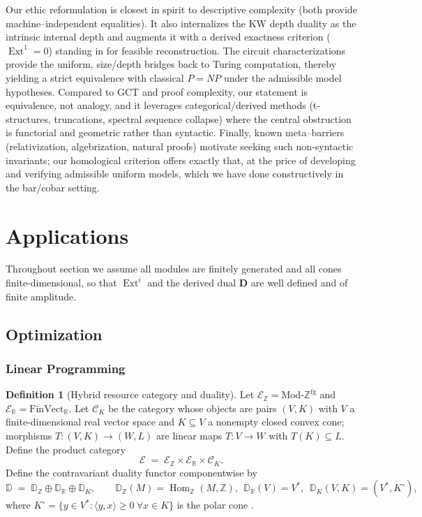 \documentclass[12pt]{article}
\newcommand{\Hom}{\operatorname{Hom}}
\newcommand{\Ext}{\operatorname{Ext}}
\theoremstyle{plain}
\theoremstyle{definition}
\newtheorem{definition}[theorem]{Definition}
\theoremstyle{remark}
\numberwithin{equation}{section}
\begin{document}
Our ethic reformulation is closest in spirit to descriptive complexity (both provide machine–independent equalities). It also internalizes the KW depth duality as the intrinsic internal depth and augments it with a derived exactness criterion ($\Ext^1=0$) standing in for feasible reconstruction. The circuit characterizations provide the uniform, size/depth bridges back to Turing computation, thereby yielding a strict equivalence with classical $P{=}NP$ under the admissible model hypotheses. Compared to GCT and proof complexity, our statement is equivalence, not analogy, and it leverages categorical/derived methods (t-structures, truncations, spectral sequence collapse) where the central obstruction is functorial and geometric rather than syntactic. Finally, known meta–barriers (relativization, algebrization, natural proofs) motivate seeking such non-syntactic invariants; our homological criterion offers exactly that, at the price of developing and verifying admissible uniform models, which we have done constructively in the bar/cobar setting.

\section{Applications}

Throughout section we assume all modules are finitely generated
and all cones finite-dimensional, so that
$\Ext^i$ and the derived dual $\mathbf D$
are well defined and of finite amplitude.

\subsection{Optimization}

\subsubsection{Linear Programming}\label{subsec:milp-lp-sdp}

\begin{definition}[Hybrid resource category and duality]
Let $\mathcal E_{\mathbb Z}=\mathrm{Mod}\text{-}\mathbb Z^{\mathrm{fg}}$ and $\mathcal E_{\mathbb R}=\mathrm{FinVect}_{\mathbb R}$. Let $\mathcal C_K$ be the category whose objects are pairs $(V,K)$ with $V$ a finite-dimensional real vector space and $K\subseteq V$ a nonempty closed convex cone; morphisms $T:(V,K)\to(W,L)$ are linear maps $T:V\to W$ with $T(K)\subseteq L$. Define the product category
\[
\mathcal E \;=\; \mathcal E_{\mathbb Z}\times \mathcal E_{\mathbb R}\times \mathcal C_K.
\]
Define the contravariant duality functor componentwise by
\[
\mathbb D \;=\; \mathbb D_{\mathbb Z}\oplus \mathbb D_{\mathbb R}\oplus \mathbb D_{K},
\qquad
\mathbb D_{\mathbb Z}(M)=\Hom_{\mathbb Z}(M,\mathbb Z),\ \ 
\mathbb D_{\mathbb R}(V)=V^*,\ \ 
\mathbb D_{K}(V,K)=(V^*,K^\circ),
\]
where $K^\circ=\{y\in V^*: \langle y,x\rangle\ge 0\ \forall x\in K\}$ is the polar cone \cite{Rockafellar1970}.
\end{definition}
\end{document}
